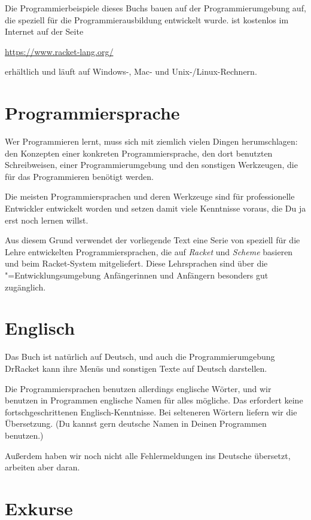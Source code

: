 Die Programmierbeispiele dieses Buchs bauen auf der
Programmierumgebung \drscheme{}\index{\drscheme{}} auf, die speziell
für die Programmierausbildung entwickelt wurde. 
\drscheme{} ist kostenlos im Internet auf der Seite
%
\begin{center}
  \url{https://www.racket-lang.org/}
\end{center}
%
erhältlich und läuft auf Windows-, Mac- und Unix-/Linux-Rechnern.

\section{Programmiersprache}

Wer Programmieren lernt, muss sich mit ziemlich vielen Dingen
herumschlagen: den Konzepten einer konkreten Programmiersprache, den
dort benutzten Schreibweisen, einer Programmierumgebung und den
sonstigen Werkzeugen, die für das Programmieren benötigt werden.

Die meisten Programmiersprachen und deren Werkzeuge sind für
professionelle Entwickler entwickelt worden und setzen damit viele
Kenntnisse voraus, die Du ja erst noch lernen willst.

Aus diesem Grund verwendet der vorliegende Text eine Serie von
speziell für die Lehre entwickelten Programmiersprachen, die auf
\textit{Racket} und \textit{Scheme}
basieren und beim Racket-System mitgeliefert.
Diese Lehrsprachen sind über die
\drscheme"=Entwicklungsumgebung Anfängerinnen und Anfängern besonders
gut zugänglich.

\section{Englisch}

Das Buch ist natürlich auf Deutsch, und auch die Programmierumgebung
DrRacket kann ihre Menüs und sonstigen Texte auf Deutsch darstellen.

Die Programmiersprachen benutzen allerdings englische Wörter, und wir
benutzen in Programmen englische Namen für alles mögliche.  Das
erfordert keine fortschgeschrittenen Englisch-Kenntnisse.  Bei
selteneren Wörtern liefern wir die Übersetzung.  (Du kannst gern
deutsche Namen in Deinen Programmen benutzen.)

Außerdem haben wir noch nicht alle Fehlermeldungen ins Deutsche
übersetzt, arbeiten aber daran.

\section{Exkurse}

